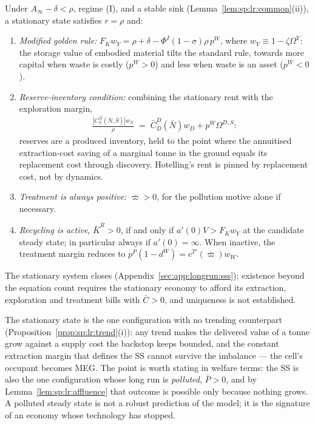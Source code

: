 \begin{proposition}\label{prop:sp:lr:sss}
Under $A_\infty-\delta<\rho$, regime (I), and a stable sink
(Lemma~\ref{lem:sp:lr:common}(ii)), a stationary state satisfies $r=\rho$ and:
\begin{enumerate}
    \item \emph{Modified golden rule:} $F_Kw_Y=\rho+\delta-\Phi^I\left(1-\sigma\right)\rho\,p^W$,
    where $w_Y\equiv1-\zeta\Omega^Y$: the storage value of embodied material tilts the standard
    rule, towards more capital when waste is costly ($p^W>0$) and less when waste is an asset
    ($p^W<0$).
    \item \emph{Reserve-inventory condition:} combining the stationary rent with the exploration
    margin,
    \begin{align}
    \frac{\left|C^N_S\left(\bar N,\bar S\right)\right|w_N}{\rho}
    \;=\;\bar C^D_D\left(\bar N\right)w_D+p^W\Omega^{D,S}:
    \label{eq:sp:lr:inventory}
    \end{align}
    reserves are a produced inventory, held to the point where the annuitised extraction-cost
    saving of a marginal tonne in the ground equals its replacement cost through discovery.
    Hotelling's rent is pinned by replacement cost, not by dynamics.
    \item \emph{Treatment is always positive:} $\bar\varpi>0$, for the pollution motive alone if
    necessary.
    \item \emph{Recycling is active}, $\bar K^R>0$, if and only if $a'(0)V>F_Kw_Y$ at the
    candidate steady state; in particular always if $a'(0)=\infty$. When inactive, the treatment
    margin reduces to $p^P\left(1-d^W\right)=c^{T\prime}\left(\bar\varpi\right)w_W$.
\end{enumerate}
The stationary system closes (Appendix~\ref{sec:app:longrun:sss}); existence beyond the equation
count requires the stationary economy to afford its extraction, exploration and treatment bills
with $\bar C>0$, and uniqueness is not established.
\end{proposition}

 The stationary state is the one configuration
with no trending counterpart (Proposition~\ref{prop:sp:lr:trend}(i)): any trend makes the
delivered value of a tonne grow against a supply cost the backstop keeps bounded, and the
constant extraction margin that defines the SS cannot survive the imbalance --- the cell's
occupant becomes MEG. The point is worth stating in welfare terms: the SS is also the one
configuration whose long run is \emph{polluted}, $\bar P>0$, and by
Lemma~\ref{lem:sp:lr:affluence} that outcome is possible only because nothing grows. A
polluted steady state is not a robust prediction of the model; it is the signature of an
economy whose technology has stopped.

